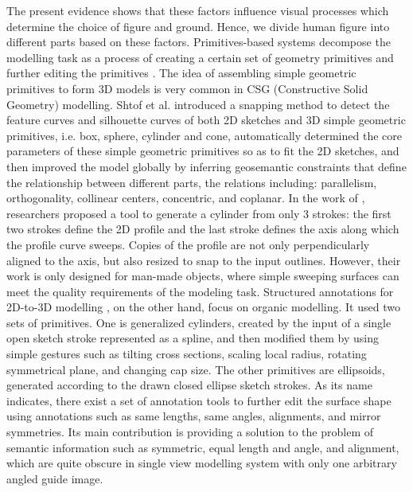 \documentclass[runningheads]{llncs}
\begin{document}
The present evidence shows that these factors influence visual processes which determine the choice of figure and ground. Hence, we divide human figure into different parts based on these factors. Primitives-based systems decompose the modelling task as a process of creating a certain set of geometry primitives and further editing the primitives \cite{shtof2013geosemantic,chen2003visual,xu2016interactive}. The idea of assembling simple geometric primitives to form 3D models is very common in CSG (Constructive Solid Geometry) modelling. Shtof et al. \cite{shtof2013geosemantic} introduced a snapping method to detect the feature curves and silhouette curves of both 2D sketches and 3D simple geometric primitives, i.e. box, sphere, cylinder and cone, automatically determined the core parameters of these simple geometric primitives so as to fit the 2D sketches, and then improved the model globally by inferring geosemantic constraints that define the relationship between different parts, the relations including: parallelism, orthogonality, collinear centers, concentric, and coplanar. In the work of \cite{chen2003visual}, researchers proposed a tool to generate a cylinder from only 3 strokes: the first two strokes define the 2D profile and the last stroke defines the axis along which the profile curve sweeps. Copies of the profile are not only perpendicularly aligned to the axis, but also resized to snap to the input outlines. However, their work is only designed for man-made objects, where simple sweeping surfaces can meet the quality requirements of the modeling task. Structured annotations for 2D-to-3D modelling \cite{gingold2009structured}, on the other hand, focus on organic modelling. It used two sets of primitives. One is generalized cylinders, created by the input of a single open sketch stroke represented as a spline, and then modified them by using simple gestures such as tilting cross sections, scaling local radius, rotating symmetrical plane, and changing cap size. The other primitives are ellipsoids, generated according to the drawn closed ellipse sketch strokes. As its name indicates, there exist a set of annotation tools to further edit the surface shape using annotations such as same lengths, same angles, alignments, and mirror symmetries. Its main contribution is providing a solution to the problem of semantic information such as symmetric, equal length and angle, and alignment, which are quite obscure in single view modelling system with only one arbitrary angled guide image. \\
\end{document}
